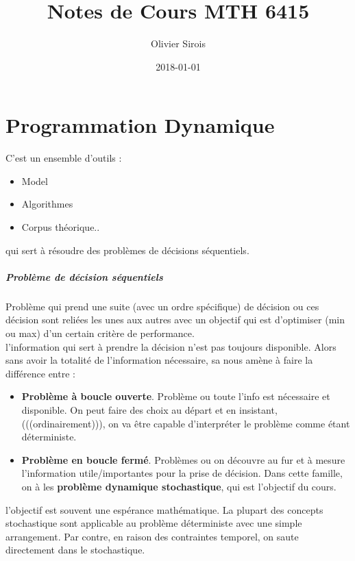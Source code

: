 \documentclass[oneside]{book}
\title{Notes de Cours MTH 6415}
\date{2018-01-01}
\author{Olivier Sirois}
\begin{document}
\setcounter{page}{1}
\maketitle
\tableofcontents

\chapter{Programmation Dynamique}
C'est un ensemble d'outils :

\begin{itemize}
\item Model
\item Algorithmes
\item Corpus théorique..
\end{itemize}

qui sert à résoudre des problèmes de décisions séquentiels.
\paragraph{Problème de décision séquentiels} Problème qui prend une suite (avec un ordre spécifique) de décision ou ces décision sont reliées les unes aux autres avec un objectif qui est d'optimiser (min ou max) d'un certain critère de performance.\\

l'information qui sert à prendre la décision n'est pas toujours disponible. Alors sans avoir la totalité de l'information nécessaire, sa nous amène à faire la différence entre :

\begin{itemize}
\item \textbf{Problème à boucle ouverte}. Problème ou toute l'info est nécessaire et  disponible. On peut faire des choix au départ et en insistant, (((ordinairement))), on va être capable d'interpréter le problème comme étant déterministe.
\item \textbf{Problème en boucle fermé}. Problèmes ou on découvre au fur et à mesure l'information utile/importantes pour la prise de décision. Dans cette famille, on à les \textbf{problème dynamique stochastique}, qui est l'objectif du cours.
\end{itemize}

l'objectif est souvent une espérance mathématique. La plupart des concepts stochastique sont applicable au problème déterministe avec une simple arrangement. Par contre, en raison des contraintes temporel, on saute directement dans le stochastique. \\
\end{document}
